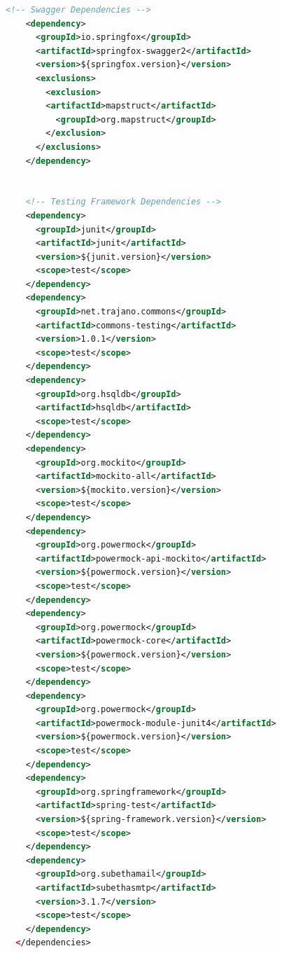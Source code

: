 \documentclass[11pt,a4paper]{article}
\begin{document}
\begin{lstlisting}[language=xml]
    <!-- Swagger Dependencies -->
    <dependency>
      <groupId>io.springfox</groupId>
      <artifactId>springfox-swagger2</artifactId>
      <version>${springfox.version}</version>
      <exclusions>
        <exclusion>
        <artifactId>mapstruct</artifactId>
          <groupId>org.mapstruct</groupId>
        </exclusion>
      </exclusions>
    </dependency>


    <!-- Testing Framework Dependencies -->
    <dependency>
      <groupId>junit</groupId>
      <artifactId>junit</artifactId>
      <version>${junit.version}</version>
      <scope>test</scope>
    </dependency>
    <dependency>
      <groupId>net.trajano.commons</groupId>
      <artifactId>commons-testing</artifactId>
      <version>1.0.1</version>
      <scope>test</scope>
    </dependency>
    <dependency>
      <groupId>org.hsqldb</groupId>
      <artifactId>hsqldb</artifactId>
      <scope>test</scope>
    </dependency>
    <dependency>
      <groupId>org.mockito</groupId>
      <artifactId>mockito-all</artifactId>
      <version>${mockito.version}</version>
      <scope>test</scope>
    </dependency>
    <dependency>
      <groupId>org.powermock</groupId>
      <artifactId>powermock-api-mockito</artifactId>
      <version>${powermock.version}</version>
      <scope>test</scope>
    </dependency>
    <dependency>
      <groupId>org.powermock</groupId>
      <artifactId>powermock-core</artifactId>
      <version>${powermock.version}</version>
      <scope>test</scope>
    </dependency>
    <dependency>
      <groupId>org.powermock</groupId>
      <artifactId>powermock-module-junit4</artifactId>
      <version>${powermock.version}</version>
      <scope>test</scope>
    </dependency>
    <dependency>
      <groupId>org.springframework</groupId>
      <artifactId>spring-test</artifactId>
      <version>${spring-framework.version}</version>
      <scope>test</scope>
    </dependency>
    <dependency>
      <groupId>org.subethamail</groupId>
      <artifactId>subethasmtp</artifactId>
      <version>3.1.7</version>
      <scope>test</scope>
    </dependency>
  </dependencies>


\end{lstlisting}
\end{document}
